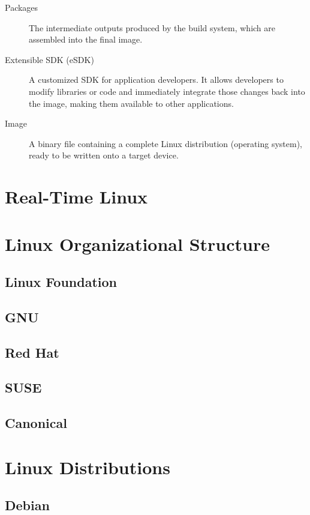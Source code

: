 \begin{description}
    \item[Packages]  
    The intermediate outputs produced by the build system, which are assembled into the  
    final image.

    \item[Extensible SDK (eSDK)]  
    A customized SDK for application developers. It allows developers to modify libraries  
    or code and immediately integrate those changes back into the image, making them  
    available to other applications.

    \item[Image]  
    A binary file containing a complete Linux distribution (operating system), ready to  
    be written onto a target device.

\end{description}


\section{Real-Time Linux}




\section{Linux Organizational Structure}
\subsection{Linux Foundation}
\subsection{GNU}
\subsection{Red Hat}
\subsection{SUSE}
\subsection{Canonical}


\section{Linux Distributions}
\subsection{Debian}
